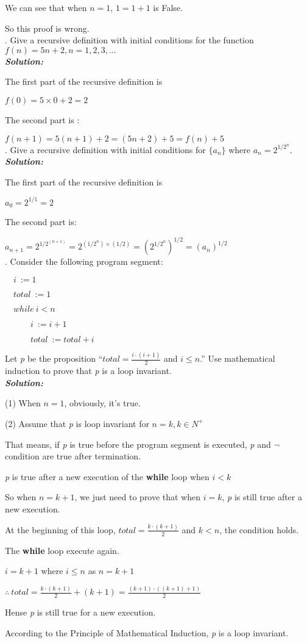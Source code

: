 \documentclass[11pt, oneside]{article}   	%
\begin{document}
We can see that when $n=1$, $1=1+1$ is False.

So this proof is wrong.\\

. Give a recursive definition with initial conditions for the function $f(n)=5n+2, n=1,2,3,...$\\
\textbf{\emph{Solution:}}

The first part of the recursive definition is 

\qquad $f(0)=5\times 0 + 2 = 2$

The second part is :

\qquad $f(n+1)=5(n+1)+2=(5n+2)+5=f(n)+5$\\

. Give a recursive definition with initial conditions for $\{a_{n}\}$ where $a_{n}=2^{1/2^{n}}$.\\
\textbf{\emph{Solution:}}

The first part of the recursive definition is 

\qquad $a_{0}=2^{1/1}=2$

The second part is:

\qquad $a_{n+1}=2^{1/2^{(n+1)}}=2^{(1/2^{n})\times (1/2)}=(2^{1/2^{n}})^{1/2}=(a_{n})^{1/2}$\\

. Consider the following program segment:

$\quad i\ :=1$

$\quad total\ :=1$

$\quad while\ i<n$

$\quad \qquad i\ :=i+1$

$\quad \qquad total\ :=total+i$

Let \emph{p} be the proposition ``$total=\frac{i\cdot (i+1)}{2}$ and $i\le n$.'' Use mathematical induction to prove that \emph{p} is a loop invariant.\\
\textbf{\emph{Solution:}}

(1) When $n=1$, obviously, it's true. 

(2) Assume that \emph{p} is loop invariant for $n=k, k\in N^{+}$

That means, if \emph{p} is true before the program segment is executed, \emph{p} and $\neg$condition are true after termination.

 \emph{p} is true after a new execution of the \textbf{while} loop when $i<k$

So when $n=k+1$, we just need to prove that when $i=k$, \emph{p} is still true after a new execution.

At the beginning of this loop, $total=\frac{k\cdot (k+1)}{2}$ and $k< n$, the condition holds.

The \textbf{while} loop execute again.

\qquad \qquad $i=k+1$ where $i\le n$ as $n=k+1$

$\therefore \ total=\frac{k\cdot (k+1)}{2}+(k+1)=\frac{(k+1)\cdot ((k+1)+1)}{2}$

Hense \emph{p} is still true for a new execution.

According to the Principle of Mathematical Induction, \emph{p} is a loop invariant.
\end{document}
